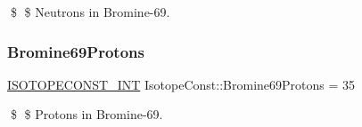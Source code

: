 \$ \$ Neutrons in Bromine-\/69. \mbox{\label{group___isotope_const-_bromine-_br69_ga1dc3da21f07b641dfa9b4dcaabd54746}} 
\subsubsection{\texorpdfstring{Bromine69\+Protons}{Bromine69Protons}}
{\footnotesize\ttfamily \mbox{\hyperlink{group___isotope_const-_macros_ga5f18360b3e99483a35c32d789e62621c}{I\+S\+O\+T\+O\+P\+E\+C\+O\+N\+S\+T\+\_\+\+I\+NT}} Isotope\+Const\+::\+Bromine69\+Protons = 35}

\$ \$ Protons in Bromine-\/69. 